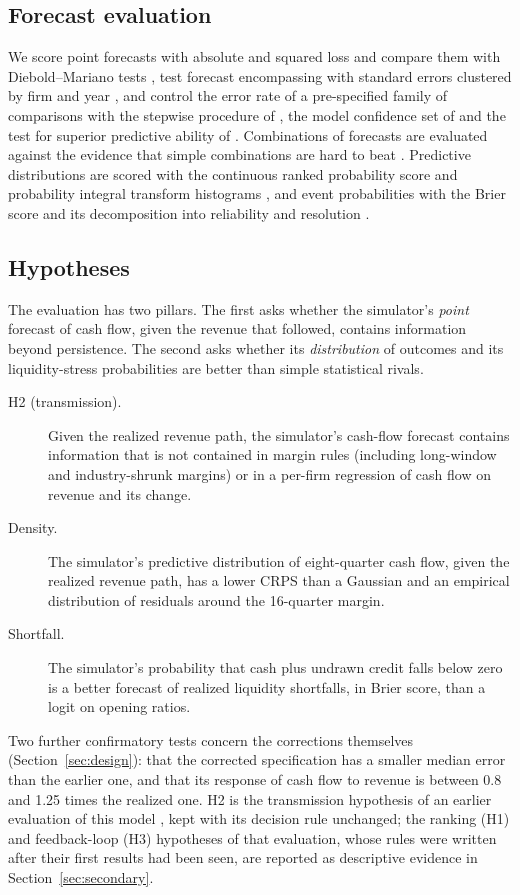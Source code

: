 \subsection{Forecast evaluation}
We score point forecasts with absolute and squared loss and compare them with Diebold--Mariano tests \citep{diebold1995}, test forecast encompassing \citep{chong1986,fair1990,harvey1998,clark2001} with standard errors clustered by firm and year \citep{petersen2009,cameron2008}, and control the error rate of a pre-specified family of comparisons with the stepwise procedure of \citet{romano2005}, the model confidence set of \citet{hansen2011} and the test for superior predictive ability of \citet{hansen2005}. Combinations of forecasts are evaluated against the evidence that simple combinations are hard to beat \citep{bates1969,clemen1989,timmermann2006,claeskens2016}. Predictive distributions are scored with the continuous ranked probability score and probability integral transform histograms \citep{diebold1998,gneiting2007,gneiting2007b}, and event probabilities with the Brier score and its decomposition into reliability and resolution \citep{murphy1973}.

\subsection{Hypotheses}
The evaluation has two pillars. The first asks whether the simulator's \emph{point} forecast of cash flow, given the revenue that followed, contains information beyond persistence. The second asks whether its \emph{distribution} of outcomes and its liquidity-stress probabilities are better than simple statistical rivals.
\begin{description}
\item[H2 (transmission).] Given the realized revenue path, the simulator's cash-flow forecast contains information that is not contained in margin rules (including long-window and industry-shrunk margins) or in a per-firm regression of cash flow on revenue and its change.
\item[Density.] The simulator's predictive distribution of eight-quarter cash flow, given the realized revenue path, has a lower CRPS than a Gaussian and an empirical distribution of residuals around the 16-quarter margin.
\item[Shortfall.] The simulator's probability that cash plus undrawn credit falls below zero is a better forecast of realized liquidity shortfalls, in Brier score, than a logit on opening ratios.
\end{description}
\noindent Two further confirmatory tests concern the corrections themselves (Section~\ref{sec:design}): that the corrected specification has a smaller median error than the earlier one, and that its response of cash flow to revenue is between 0.8 and 1.25 times the realized one. H2 is the transmission hypothesis of an earlier evaluation of this model \selfcitep{}, kept with its decision rule unchanged; the ranking (H1) and feedback-loop (H3) hypotheses of that evaluation, whose rules were written after their first results had been seen, are reported as descriptive evidence in Section~\ref{sec:secondary}.
